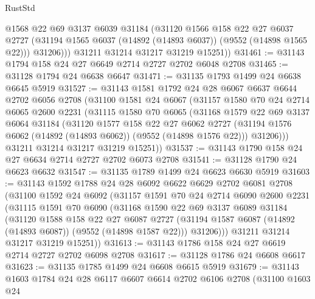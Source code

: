 \begin{lexlean}{RustStd}
\begin{coremodule}
            @1568
            @22
            @69
            @3137
            @6039
            @31184
            (@31120
              @1566
              @158
              @22
              @27
              @6037
              @2727
              (@31194 @1565 @6037 (@14892 (@14893 @6037)) (@9552 (@14898 @1565 @22)))
              @31206)))
        @31211
        @31214
        @31217
        @31219
        @15251))
@31461 := @31143 @1794 @158 @24 @27 @6649 @2714 @2727 @2702 @6048 @2708
@31465 := @31128 @1794 @24 @6638 @6647
@31471 := @31135 @1793 @1499 @24 @6638 @6645 @5919
@31527 := @31143
    @1581
    @1792
    @24
    @28
    @6067
    @6637
    @6644
    @2702
    @6056
    @2708
    (@31100
      @1581
      @24
      @6067
      (@31157
        @1580
        @70
        @24
        @2714
        @6065
        @2600
        @2231
        (@31115
          @1580
          @70
          @6065
          (@31168
            @1579
            @22
            @69
            @3137
            @6064
            @31184
            (@31120
              @1577
              @158
              @22
              @27
              @6062
              @2727
              (@31194 @1576 @6062 (@14892 (@14893 @6062)) (@9552 (@14898 @1576 @22)))
              @31206)))
        @31211
        @31214
        @31217
        @31219
        @15251))
@31537 := @31143 @1790 @158 @24 @27 @6634 @2714 @2727 @2702 @6073 @2708
@31541 := @31128 @1790 @24 @6623 @6632
@31547 := @31135 @1789 @1499 @24 @6623 @6630 @5919
@31603 := @31143
    @1592
    @1788
    @24
    @28
    @6092
    @6622
    @6629
    @2702
    @6081
    @2708
    (@31100
      @1592
      @24
      @6092
      (@31157
        @1591
        @70
        @24
        @2714
        @6090
        @2600
        @2231
        (@31115
          @1591
          @70
          @6090
          (@31168
            @1590
            @22
            @69
            @3137
            @6089
            @31184
            (@31120
              @1588
              @158
              @22
              @27
              @6087
              @2727
              (@31194 @1587 @6087 (@14892 (@14893 @6087)) (@9552 (@14898 @1587 @22)))
              @31206)))
        @31211
        @31214
        @31217
        @31219
        @15251))
@31613 := @31143 @1786 @158 @24 @27 @6619 @2714 @2727 @2702 @6098 @2708
@31617 := @31128 @1786 @24 @6608 @6617
@31623 := @31135 @1785 @1499 @24 @6608 @6615 @5919
@31679 := @31143
    @1603
    @1784
    @24
    @28
    @6117
    @6607
    @6614
    @2702
    @6106
    @2708
    (@31100
      @1603
      @24

\end{coremodule}
\end{lexlean}
